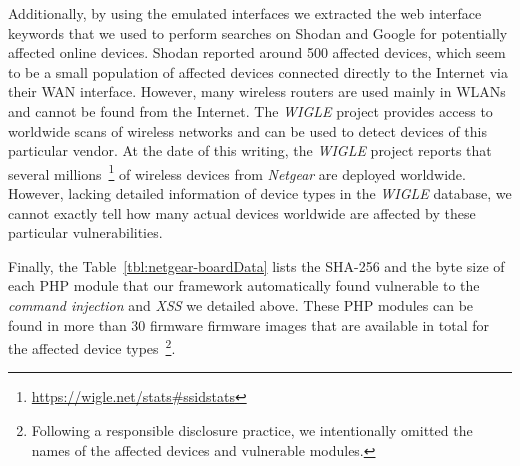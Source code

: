 \documentclass[conference]{./templates/ndss/IEEEtran}
\newcounter{t0d0_counter}
\newcounter{pr00f_counter}
\begin{document}
Additionally, by using the emulated interfaces we extracted the web interface 
keywords that we used to perform searches on Shodan and Google for 
potentially affected online devices. 
Shodan reported around 500 affected devices, which seem to be a small
population of affected devices connected directly to the Internet via
their WAN interface.
However, many wireless routers are used mainly in WLANs and cannot be found from the Internet. The \emph{WIGLE} project provides access to worldwide scans of wireless
networks and can be used to detect devices of this particular vendor.
At the date of this writing, the \emph{WIGLE} project reports that several 
millions~\footnote{\url{https://wigle.net/stats\#ssidstats}} of wireless 
devices from \emph{Netgear} are deployed worldwide. However, lacking detailed 
information of device types in the \emph{WIGLE} database, we cannot exactly 
tell how many actual devices worldwide are affected by these particular 
vulnerabilities. 





Finally, the Table~\ref{tbl:netgear-boardData} lists the SHA-256 and the byte size of 
each PHP module that our framework automatically found vulnerable to the 
\emph{command injection} and \emph{XSS} we detailed above. These PHP modules 
can be found in more than 30 firmware firmware images that are available 
in total for the affected \NetgearDeviceTypes{} device types~\footnote{
Following a responsible disclosure practice, we intentionally omitted the 
names of the affected devices and vulnerable modules.}. 
\end{document}
